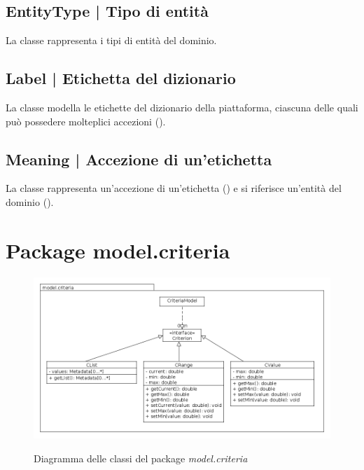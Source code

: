 \documentclass[10pt,a4paper,headinclude,footinclude,hidelinks]{scrreprt} %
\begin{document}
	\subsection[EntityType]{EntityType | Tipo di entità}
	\label{sec:stage:design:model:entity-type}
	La classe \textit{} rappresenta i tipi di entità del dominio.

	\subsection[Label]{Label | Etichetta del dizionario}
	\label{sec:stage:design:model:label}
	La classe \textit{} modella le etichette del dizionario della piattaforma, ciascuna delle quali può possedere molteplici accezioni (\textit{}).

	\subsection[Meaning]{Meaning | Accezione di un'etichetta}
	\label{sec:stage:design:model:meaning}
	La classe \textit{} rappresenta un'accezione di un'etichetta (\textit{}) e si riferisce un'entità del dominio (\textit{}).

	\section{Package model.criteria}
	\label{sec:stage:design:model.criteria}

	\begin{figure}[ht]
		\begin{center}
	    	\includegraphics[width=12cm]{class/model_criteria.png}
			\label{gfx:class:model:criteria}
			\caption{Diagramma delle classi del package \textit{model.criteria}}
		\end{center}
	\end{figure}
\end{document}
